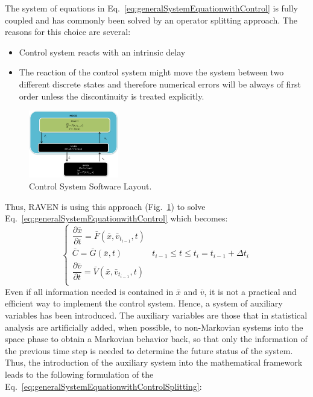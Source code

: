 \documentclass{anstrans}
\begin{document}
The system of equations in Eq.~\ref{eq:generalSystemEquationwithControl} is fully coupled and has commonly been solved by an operator splitting approach. The reasons for this choice are several:
\begin{itemize}
\item Control system reacts with an intrinsic delay
\item The reaction of the control system might move the system between two different discrete states and
therefore numerical errors will be always of first order unless the discontinuity is treated explicitly.
\end{itemize}
\begin{figure}
\centering
\includegraphics[width=0.35\textwidth]{figures/ControlSystemSoftwareLayout.pdf}
\caption{Control System Software Layout.}
\label{fig:ControlSoftwareLayout}
\end{figure}
Thus, RAVEN is using this approach (Fig.~\ref{fig:ControlSoftwareLayout}) to solve Eq.~\ref{eq:generalSystemEquationwithControl} which becomes:
\begin{equation}
\begin{cases}
\dfrac{\partial \bar{x}}{\partial t} = \bar{F}(\bar{x},\bar{v}_{t_{i-1}},t) \\
\bar{C} = \bar{G}(\bar{x},t) & t_{i-1}\leq t\leq t_{i} = t_{i-1} + \Delta t_{i}\\
\dfrac{\partial \bar{v}}{\partial t} = \bar{V}(\bar{x},\bar{v}_{t_{i-1}},t) \\
\end{cases}
\label{eq:generalSystemEquationwithControlSplitting}
\end{equation}
Even if all information needed is contained in $\bar{x}$ and $\bar{v}$, it is not a practical and efficient way to implement the control system. Hence, a system of auxiliary variables has been introduced.
The auxiliary variables are those that in statistical analysis are artificially added, when possible, to non-Markovian systems into the space phase to obtain a Markovian behavior back, so that only the information of the previous time step is needed to determine the future status of the system.
Thus, the introduction of the auxiliary system into the mathematical framework leads to the following formulation of the Eq.~\ref{eq:generalSystemEquationwithControlSplitting}:
\end{document}
